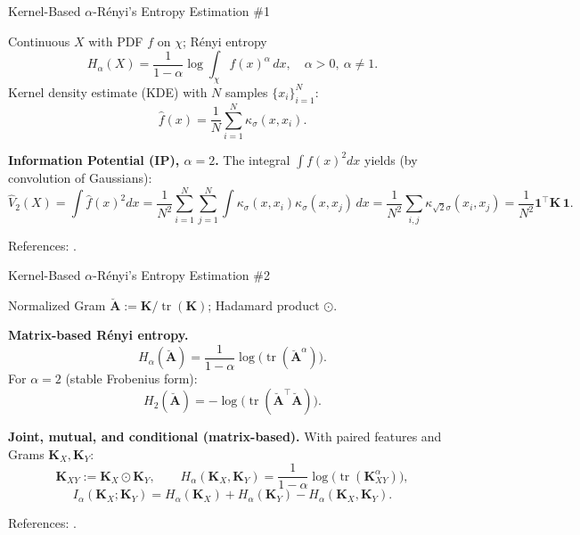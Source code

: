 \documentclass[aspectratio=169]{beamer}
\let\oldcite\cite %
\renewcommand{\cite}[1]{{\tiny\oldcite{#1}}}
\begin{document}



\begin{frame}{Kernel-Based $\alpha$-Rényi's Entropy Estimation \#1}

Continuous $X$ with PDF $f$ on $\chi$; Rényi entropy
\[
H_{\alpha}(X)=\frac{1}{1-\alpha}\log\!\int_{\chi} f(x)^{\alpha}\,dx,\quad \alpha>0,\ \alpha\neq 1.
\]
Kernel density estimate (KDE) with $N$ samples $\{x_i\}_{i=1}^{N}$:
\[
\hat f(x)=\frac{1}{N}\sum_{i=1}^{N}\kappa_\sigma(x,x_i).
\]

\medskip
\textbf{Information Potential (IP), $\alpha=2$.}
The integral $\int f(x)^2dx$ yields (by convolution of Gaussians):
\[
\hat V_2(X)=\int \hat f(x)^2dx
=\frac{1}{N^2}\sum_{i=1}^{N}\sum_{j=1}^{N}\int \kappa_\sigma(x,x_i)\kappa_\sigma(x,x_j)\,dx
=\frac{1}{N^2}\sum_{i,j}\kappa_{\sqrt{2}\sigma}(x_i,x_j)=\frac{1}{N^2}\mathbf{1}^\top \mathbf{K}\,\mathbf{1}.
\]

\footnotesize References: \cite{principe2010information,silverman2018density,bromiley2003products,xu2008reproducing}.
\end{frame}



\begin{frame}{Kernel-Based $\alpha$-Rényi's Entropy Estimation \#2}

Normalized Gram $\breve{\mathbf{A}}:=\mathbf{K}/\operatorname{tr}(\mathbf{K})$;
Hadamard product $\odot$.

\medskip
\textbf{Matrix-based Rényi entropy.}
\[
H_{\alpha}(\breve{\mathbf{A}})=\frac{1}{1-\alpha}\log\!\big(\operatorname{tr}(\breve{\mathbf{A}}^{\alpha})\big).
\]
For $\alpha=2$ (stable Frobenius form):
\[
H_2(\breve{\mathbf{A}})=-\log\!\big(\operatorname{tr}(\breve{\mathbf{A}}^\top\breve{\mathbf{A}})\big).
\]

\medskip
\textbf{Joint, mutual, and conditional (matrix-based).}
With paired features and Grams $\mathbf{K}_X,\mathbf{K}_Y$:
\[
\mathbf{K}_{XY}:=\mathbf{K}_{X}\odot \mathbf{K}_{Y},\qquad
H_{\alpha}(\mathbf{K}_X,\mathbf{K}_Y)=\frac{1}{1-\alpha}\log\!\big(\operatorname{tr}(\mathbf{K}_{XY}^{\alpha})\big),
\]
\[
I_{\alpha}(\mathbf{K}_X;\mathbf{K}_Y)=H_{\alpha}(\mathbf{K}_X)+H_{\alpha}(\mathbf{K}_Y)-H_{\alpha}(\mathbf{K}_X,\mathbf{K}_Y).
\]

\footnotesize References: \cite{giraldo2014measures,giraldo2013information}.
\end{frame}
\end{document}
